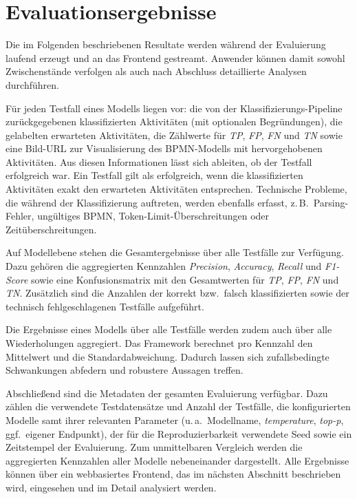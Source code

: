 \section{Evaluationsergebnisse}\label{sec:generierte-resultate}

Die im Folgenden beschriebenen Resultate werden während der Evaluierung laufend erzeugt und an das Frontend gestreamt. Anwender können damit sowohl Zwischenstände verfolgen als auch nach Abschluss detaillierte Analysen durchführen.

Für jeden Testfall eines Modells liegen vor: die von der Klassifizierungs-Pipeline zurückgegebenen klassifizierten Aktivitäten (mit optionalen Begründungen), die gelabelten erwarteten Aktivitäten, die Zählwerte für \emph{\ac{TP}}, \emph{\ac{FP}}, \emph{\ac{FN}} und \emph{\ac{TN}} sowie eine Bild-URL zur Visualisierung des \ac{BPMN}-Modells mit hervorgehobenen Aktivitäten. Aus diesen Informationen lässt sich ableiten, ob der Testfall erfolgreich war. Ein Testfall gilt als erfolgreich, wenn die klassifizierten Aktivitäten exakt den erwarteten Aktivitäten entsprechen. Technische Probleme, die während der Klassifizierung auftreten, werden ebenfalls erfasst, z.\,B.\ Parsing-Fehler, ungültiges \ac{BPMN}, Token-Limit-Überschreitungen oder Zeitüberschreitungen.

Auf Modellebene stehen die Gesamtergebnisse über alle Testfälle zur Verfügung. Dazu gehören die aggregierten Kennzahlen \emph{Precision}, \emph{Accuracy}, \emph{Recall} und \emph{F1-Score} sowie eine Konfusionsmatrix mit den Gesamtwerten für \emph{\ac{TP}}, \emph{\ac{FP}}, \emph{\ac{FN}} und \emph{\ac{TN}}. Zusätzlich sind die Anzahlen der korrekt bzw.\ falsch klassifizierten sowie der technisch fehlgeschlagenen Testfälle aufgeführt.

Die Ergebnisse eines Modells über alle Testfälle werden zudem auch über alle Wiederholungen aggregiert. Das Framework berechnet pro Kennzahl den Mittelwert und die Standardabweichung. Dadurch lassen sich zufallsbedingte Schwankungen abfedern und robustere Aussagen treffen.

Abschließend sind die Metadaten der gesamten Evaluierung verfügbar. Dazu zählen die verwendete Testdatensätze und Anzahl der Testfälle, die konfigurierten Modelle samt ihrer relevanten Parameter (u.\,a.\ Modellname, \emph{temperature}, \emph{top-p}, ggf.\ eigener Endpunkt), der für die Reproduzierbarkeit verwendete Seed sowie ein Zeitstempel der Evaluierung. Zum unmittelbaren Vergleich werden die aggregierten Kennzahlen aller Modelle nebeneinander dargestellt. Alle Ergebnisse können über ein webbasiertes Frontend, das im nächsten Abschnitt beschrieben wird, eingesehen und im Detail analysiert werden.
